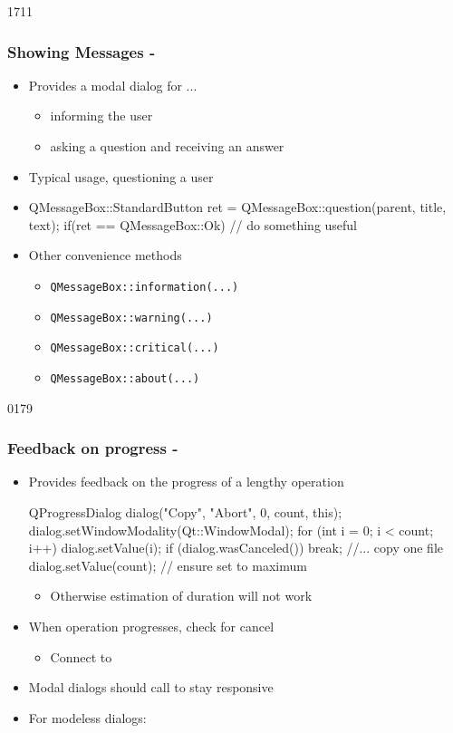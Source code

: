 \begin{slide}[fragile]{1711}
  \frametitle{Showing Messages - }
\begin{itemize}
\item Provides a modal dialog for ...
  \begin{itemize}
  \item informing the user
  \item asking a question and receiving an answer
  \end{itemize}

  \item Typical usage, questioning a user
  \item[]
    \begin{cpp}
QMessageBox::StandardButton ret = 
   QMessageBox::question(parent, title, text);
if(ret == QMessageBox::Ok) {
  // do something useful
}
    \end{cpp}
  \item Other convenience methods
    \begin{itemize}
    \item \texttt{QMessageBox::information(...)}
    \item \texttt{QMessageBox::warning(...)}
    \item \texttt{QMessageBox::critical(...)}
    \item \texttt{QMessageBox::about(...)}
   \end{itemize}
 \end{itemize}
\end{slide}


\begin{slide}[fragile]{0179}
\frametitle{Feedback on progress - }
\begin{itemize}
  \item Provides feedback on the progress of a lengthy operation
   \begin{cpp}
QProgressDialog dialog("Copy", "Abort", 0, count, this);
dialog.setWindowModality(Qt::WindowModal);
for (int i = 0; i < count; i++) {
  dialog.setValue(i);
  if (dialog.wasCanceled()) { break; }
  //... copy one file
}
dialog.setValue(count); // ensure set to maximum      
    \end{cpp}
    \begin{itemize}
    \item Otherwise estimation of duration will not work
    \end{itemize}
  \item When operation progresses, check for cancel
    \begin{itemize}
    \item Connect to 
    \end{itemize}
  \item Modal dialogs should call  to stay responsive
  \item For modeless dialogs: 
  \end{itemize}
\end{slide}

